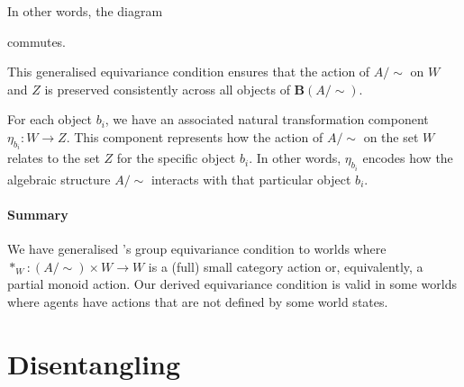 In other words, the diagram 
 
 commutes.

This generalised equivariance condition ensures that the action of $A/\sim$ on $W$ and $Z$ is preserved consistently across all objects of $\textbf{B}(A/\sim)$.

\begin{remark}
    For each object $b_i$, we have an associated natural transformation component $\eta_{b_i}: W \to Z$.
    This component represents how the action of $A/\sim$ on the set $W$ relates to the set $Z$ for the specific object $b_i$.
    In other words, $\eta_{b_i}$ encodes how the algebraic structure $A/\sim$ interacts with that particular object $b_i$.
\end{remark}


\paragraph{Summary}
We have generalised \autocite{Higgins2018}'s group equivariance condition to worlds where $*_{W}: (A/\sim) \times W \to W$ is a (full) small category action or, equivalently, a partial monoid action.
Our derived equivariance condition is valid in some worlds where agents have actions that are not defined by some world states.


\section{Disentangling}

